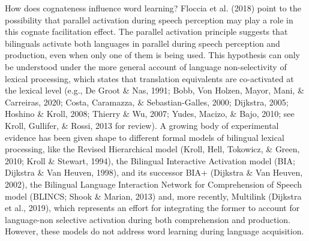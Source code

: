 \documentclass[
  english,
  man,man,floatsintext]{apa6}
\begin{document}
How does cognateness influence word learning? Floccia et al. (2018) point to the possibility that parallel activation during speech perception may play a role in this cognate facilitation effect. The parallel activation principle suggests that bilinguals activate both languages in parallel during speech perception and production, even when only one of them is being used. This hypothesis can only be understood under the more general account of language non-selectivity of lexical processing, which states that translation equivalents are co-activated at the lexical level (e.g., De Groot \& Nas, 1991; Bobb, Von Holzen, Mayor, Mani, \& Carreiras, 2020; Costa, Caramazza, \& Sebastian-Galles, 2000; Dijkstra, 2005; Hoshino \& Kroll, 2008; Thierry \& Wu, 2007; Yudes, Macizo, \& Bajo, 2010; see Kroll, Gullifer, \& Rossi, 2013 for review). A growing body of experimental evidence has been given shape to different formal models of bilingual lexical processing, like the Revised Hierarchical model (Kroll, Hell, Tokowicz, \& Green, 2010; Kroll \& Stewart, 1994), the Bilingual Interactive Activation model (BIA; Dijkstra \& Van Heuven, 1998), and its successor BIA+ (Dijkstra \& Van Heuven, 2002), the Bilingual Language Interaction Network for Comprehension of Speech model (BLINCS; Shook \& Marian, 2013) and, more recently, Multilink (Dijkstra et al., 2019), which represents an effort for integrating the former to account for language-non selective activation during both comprehension and production. However, these models do not address word learning during language acquisition.
\end{document}
